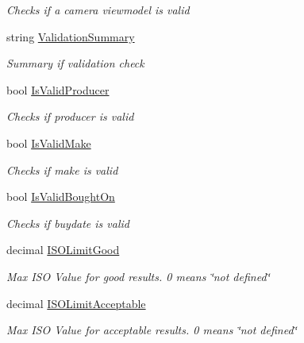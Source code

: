\begin{DoxyCompactItemize}
\begin{DoxyCompactList}\small\item\em Checks if a camera viewmodel is valid \end{DoxyCompactList}\item 
string \mbox{\hyperlink{class_pic_d_b_1_1_view_models_1_1_camera_view_model_a6cb8ea52632e1e5aefd6a6e54691dbeb}{Validation\+Summary}}
\begin{DoxyCompactList}\small\item\em Summary if validation check \end{DoxyCompactList}\item 
bool \mbox{\hyperlink{class_pic_d_b_1_1_view_models_1_1_camera_view_model_ad5b2a5bce051ecbfc1ae3754a3f8aa44}{Is\+Valid\+Producer}}
\begin{DoxyCompactList}\small\item\em Checks if producer is valid \end{DoxyCompactList}\item 
bool \mbox{\hyperlink{class_pic_d_b_1_1_view_models_1_1_camera_view_model_ad9c951f992a386532ef5f512fd3e1ff0}{Is\+Valid\+Make}}
\begin{DoxyCompactList}\small\item\em Checks if make is valid \end{DoxyCompactList}\item 
bool \mbox{\hyperlink{class_pic_d_b_1_1_view_models_1_1_camera_view_model_a74319f7025c06dfb7978fa7fb5e7b162}{Is\+Valid\+Bought\+On}}
\begin{DoxyCompactList}\small\item\em Checks if buydate is valid \end{DoxyCompactList}\item 
decimal \mbox{\hyperlink{class_pic_d_b_1_1_view_models_1_1_camera_view_model_a5b469c0b88da60e062ba0211973ae52d}{I\+S\+O\+Limit\+Good}}
\begin{DoxyCompactList}\small\item\em Max I\+SO Value for good results. 0 means \char`\"{}not defined\char`\"{} \end{DoxyCompactList}\item 
decimal \mbox{\hyperlink{class_pic_d_b_1_1_view_models_1_1_camera_view_model_a128275fdf0e7d3951568987a003405eb}{I\+S\+O\+Limit\+Acceptable}}
\begin{DoxyCompactList}\small\item\em Max I\+SO Value for acceptable results. 0 means \char`\"{}not defined\char`\"{} \end{DoxyCompactList}\end{DoxyCompactItemize}


